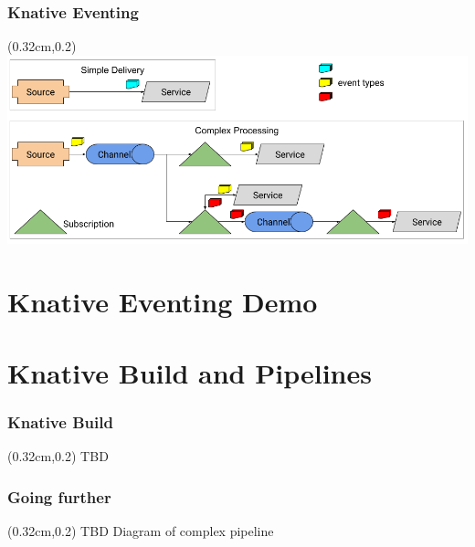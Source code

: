 \documentclass[aspectratio=169,11pt,hyperref={colorlinks=true}]{beamer}
\begin{document}
\begin{lblackrwhiteframe}
\begin{tblackbgrayframe}
  \frametitle{Knative Eventing}
  \begin{textblock*}{\paperwidth}(0.32cm,0.2\paperheight)
    \centering
    \includegraphics[width=0.9\paperwidth]{img/eventing-control-plane.png}
  \end{textblock*}
\end{tblackbgrayframe}

\section{Knative Eventing Demo}

\section{Knative Build and Pipelines}

\begin{tblackbgrayframe}
  \frametitle{Knative Build}
  \begin{textblock*}{\paperwidth}(0.32cm,0.2\paperheight)
    \centering
    TBD
  \end{textblock*}
\end{tblackbgrayframe}

\begin{tblackbgrayframe}
  \frametitle{Going further}
  \begin{textblock*}{\paperwidth}(0.32cm,0.2\paperheight)
    \centering
    TBD Diagram of complex pipeline
  \end{textblock*}
\end{tblackbgrayframe}


\end{lblackrwhiteframe}
\end{document}
